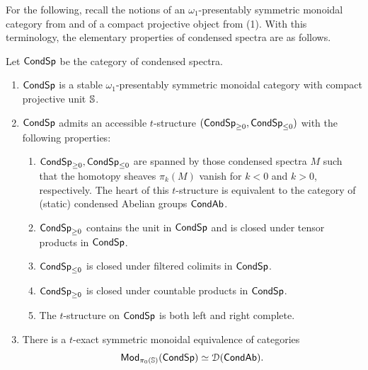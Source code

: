 For the following, recall the notions of an $\omega_{1}$-presentably symmetric monoidal category from  and of a compact projective object from  (1). With this terminology, the elementary properties of condensed spectra are as follows. 
\begin{theorem}\label{thm: properties of condensed spectra}
    Let $\mathsf{Cond}\mathsf{Sp}$ be the category of condensed spectra. 
    \begin{enumerate}
        \item $\mathsf{Cond}\mathsf{Sp}$ is a stable $\omega_{1}$-presentably symmetric monoidal category with compact projective unit $\mathbb{S}$. 
        \item $\mathsf{Cond}\mathsf{Sp}$ admits an accessible $t$-structure $(\mathsf{Cond}\mathsf{Sp}_{\geq0},\mathsf{Cond}\mathsf{Sp}_{\leq0})$ with the following properties: 
        \begin{enumerate}[label=(\roman*)]
            \item $\mathsf{Cond}\mathsf{Sp}_{\geq0},\mathsf{Cond}\mathsf{Sp}_{\leq0}$ are spanned by those condensed spectra $M$ such that the homotopy sheaves $\pi_{k}(M)$ vanish for $k<0$ and $k>0$, respectively. The heart of this $t$-structure is equivalent to the category of (static) condensed Abelian groups $\mathsf{Cond}\mathsf{Ab}$. 
            \item $\mathsf{Cond}\mathsf{Sp}_{\geq0}$ contains the unit in $\mathsf{Cond}\mathsf{Sp}$ and is closed under tensor products in $\mathsf{Cond}\mathsf{Sp}$. 
            \item $\mathsf{Cond}\mathsf{Sp}_{\leq0}$ is closed under filtered colimits in $\mathsf{Cond}\mathsf{Sp}$. 
            \item $\mathsf{Cond}\mathsf{Sp}_{\geq0}$ is closed under countable products in $\mathsf{Cond}\mathsf{Sp}$. 
            \item The $t$-structure on $\mathsf{Cond}\mathsf{Sp}$ is both left and right complete. 
        \end{enumerate}
        \item There is a $t$-exact symmetric monoidal equivalence of categories 
        $$\mathsf{Mod}_{\pi_{0}(\mathbb{S})}(\mathsf{Cond}\mathsf{Sp})\simeq\EuScript{D}(\mathsf{Cond}\mathsf{Ab}).$$ 
    \end{enumerate}
\end{theorem}
